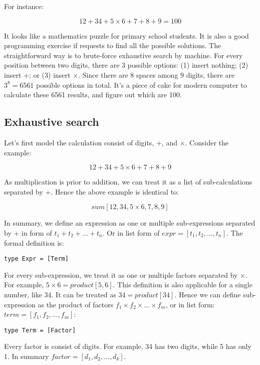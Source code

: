 \documentclass{article}
\begin{document}
For instance:

\[
12 + 34 + 5 \times 6 + 7 + 8 + 9 = 100
\]

It looks like a mathematics puzzle for primary school students. It is also a good programming exercise if requests to find all the possible solutions. The straightforward way is to brute-force exhaustive search by machine. For every position between two digits, there are 3 possible options: (1) insert nothing; (2) insert +; or (3) insert $\times$. Since there are 8 spaces among 9 digits, there are $3^8 = 6561$ possible options in total. It's a piece of cake for modern computer to calculate these 6561 results, and figure out which are 100.

\subsection{Exhaustive search}

Let's first model the calculation consist of digits, +, and $\times$. Consider the example:

\[
12 + 34 + 5 \times 6 + 7 + 8 + 9
\]

As multiplication is prior to addition, we can treat it as a list of sub-calculations separated by +. Hence the above example is identical to:

\[
sum [12, 34, 5 \times 6, 7, 8, 9]
\]

In summary, we define an expression as one or multiple sub-expressions separated by + in form of $t_1 + t_2 + ... + t_n$. Or in list form of $expr = [t_1, t_2, ..., t_n]$. The formal definition is:

\lstset{frame = none}
\begin{lstlisting}
type Expr = [Term]
\end{lstlisting}

For every sub-expression, we treat it as one or multiple factors separated by $\times$. For example, $5 \times 6 = product [5, 6]$. This definition is also applicable for a single number, like $34$. It can be treated as $34 = product [34]$. Hence we can define sub-expression as the product of factors $f_1 \times f_2 \times ... \times f_m$, or in list form: $term = [f_1, f_2, ..., f_m]$:

\begin{lstlisting}
type Term = [Factor]
\end{lstlisting}

Every factor is consist of digits. For example, 34 has two digits, while 5 has only 1. In summary $factor = [d_1, d_2, ..., d_k]$.
\end{document}
